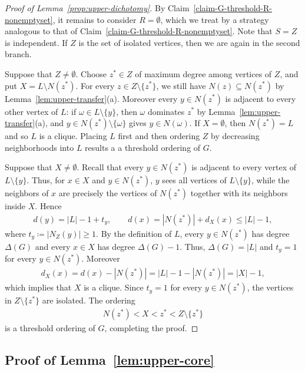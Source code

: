 \documentclass[10pt,a4paper]{article}
\begin{document}
\begin{proof}[Proof of Lemma~\ref{prop:upper-dichotomy}]
    
By Claim~\ref{claim-G-threshold-R-nonemptyset}, it remains to consider $R=\emptyset$, which we treat by a strategy analogous to that of Claim~\ref{claim-G-threshold-R-nonemptyset}. Note that $S=Z$ is independent. If $Z$ is the set of isolated vertices, then we are again in the second branch. 

Suppose that $Z\neq \emptyset$. Choose $z^*\in Z$ of maximum degree among vertices of $Z$, and put $X=L\setminus N(z^*)$.  For every $z\in Z\setminus\{z^*\}$, we still have $N(z)\subseteq N(z^*)$ by  Lemma~\ref{lem:upper-transfer}(a).   Moreover every $y\in N(z^*)$ is adjacent to every other vertex of $L$: if $\omega\in L\setminus\{y\}$, then $\omega$ dominates $z^*$ by Lemma~\ref{lem:upper-transfer}(a), and $y\in N(z^*)\setminus\{\omega\}$ gives $y\in N(\omega)$. If $X=\emptyset$, then $N(z^*)=L$ and so $L$ is a clique.  Placing  $L$ first
    and then ordering $Z$ by decreasing neighborhoods into $L$ results a a threshold ordering of $G$. 
    

    
Suppose that $X\ne\emptyset$. Recall that  every $y\in N(z^*)$ is adjacent to every vertex of
    $L\setminus\{y\}$.   Thus, for $x\in X$ and $y\in N(z^*)$,  $y$ sees all vertices of $L\setminus\{y\}$, while the neighbors of $x$ are
    precisely the vertices of $N(z^*)$ together with its neighbors inside $X$.
    Hence
    \begin{align*}
      d(y)=|L|-1+t_y,
      \qquad
      d(x)=|N(z^*)|+d_X(x)\le |L|-1,
    \end{align*}
    where $t_y\coloneqq|N_Z(y)|\ge1$.  By the definition of  $L$,  every $y\in N(z^*)$ has
    degree $\Delta(G)$ and every $x\in X$ has degree $\Delta(G)-1$. Thus, 
    $\Delta(G)=|L|$ and $t_y=1$ for every $y\in N(z^*)$.  Moreover
    \begin{align*}
      d_X(x)=d(x)-|N(z^*)|=|L|-1-|N(z^*)|=|X|-1,
    \end{align*}
which implies that  $X$ is a clique.  Since $t_y=1$ for every $y\in N(z^*)$, the vertices in 
    $Z\setminus\{z^*\}$  are isolated.   The ordering
    \begin{align*}
      N(z^*)<X<z^*<Z\setminus\{z^*\}
    \end{align*}
    is a threshold ordering of $G$, completing the proof. 
\end{proof}

\subsection{Proof of Lemma~\ref{lem:upper-core}}\label{subsec:prove-lemma3.2}
\end{document}
